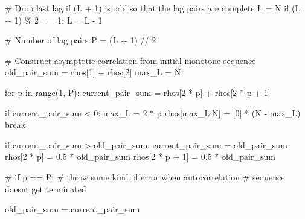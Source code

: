 \documentclass[
  letterpaper,
  DIV=11,
  numbers=noendperiod]{scrartcl}
\newenvironment{Shaded}{\begin{snugshade}}{\end{snugshade}}
\newcommand{\BuiltInTok}[1]{\textcolor[rgb]{0.00,0.23,0.31}{#1}}
\newcommand{\CommentTok}[1]{\textcolor[rgb]{0.37,0.37,0.37}{#1}}
\newcommand{\ControlFlowTok}[1]{\textcolor[rgb]{0.00,0.23,0.31}{#1}}
\newcommand{\DecValTok}[1]{\textcolor[rgb]{0.68,0.00,0.00}{#1}}
\newcommand{\FloatTok}[1]{\textcolor[rgb]{0.68,0.00,0.00}{#1}}
\newcommand{\KeywordTok}[1]{\textcolor[rgb]{0.00,0.23,0.31}{#1}}
\newcommand{\NormalTok}[1]{\textcolor[rgb]{0.00,0.23,0.31}{#1}}
\newcommand{\OperatorTok}[1]{\textcolor[rgb]{0.37,0.37,0.37}{#1}}
\begin{document}
\begin{Shaded}
\begin{Highlighting}[]
  \CommentTok{\# Drop last lag if (L + 1) is odd so that the lag pairs are complete}
\NormalTok{  L }\OperatorTok{=}\NormalTok{ N}
  \ControlFlowTok{if}\NormalTok{ (L }\OperatorTok{+} \DecValTok{1}\NormalTok{) }\OperatorTok{\%} \DecValTok{2} \OperatorTok{==} \DecValTok{1}\NormalTok{:}
\NormalTok{    L }\OperatorTok{=}\NormalTok{ L }\OperatorTok{{-}} \DecValTok{1}
  
  \CommentTok{\# Number of lag pairs}
\NormalTok{  P }\OperatorTok{=}\NormalTok{ (L }\OperatorTok{+} \DecValTok{1}\NormalTok{) }\OperatorTok{//} \DecValTok{2}
  
  \CommentTok{\# Construct asymptotic correlation from initial monotone sequence}
\NormalTok{  old\_pair\_sum }\OperatorTok{=}\NormalTok{ rhos[}\DecValTok{1}\NormalTok{] }\OperatorTok{+}\NormalTok{ rhos[}\DecValTok{2}\NormalTok{]}
\NormalTok{  max\_L }\OperatorTok{=}\NormalTok{ N}
  
  \ControlFlowTok{for}\NormalTok{ p }\KeywordTok{in} \BuiltInTok{range}\NormalTok{(}\DecValTok{1}\NormalTok{, P):}
\NormalTok{    current\_pair\_sum }\OperatorTok{=}\NormalTok{ rhos[}\DecValTok{2} \OperatorTok{*}\NormalTok{ p] }\OperatorTok{+}\NormalTok{ rhos[}\DecValTok{2} \OperatorTok{*}\NormalTok{ p }\OperatorTok{+} \DecValTok{1}\NormalTok{]}
    
    \ControlFlowTok{if}\NormalTok{ current\_pair\_sum }\OperatorTok{\textless{}} \DecValTok{0}\NormalTok{:}
\NormalTok{      max\_L }\OperatorTok{=} \DecValTok{2} \OperatorTok{*}\NormalTok{ p}
\NormalTok{      rhos[max\_L:N] }\OperatorTok{=}\NormalTok{ [}\DecValTok{0}\NormalTok{] }\OperatorTok{*}\NormalTok{ (N }\OperatorTok{{-}}\NormalTok{ max\_L)}
      \ControlFlowTok{break}
    
    \ControlFlowTok{if}\NormalTok{ current\_pair\_sum }\OperatorTok{\textgreater{}}\NormalTok{ old\_pair\_sum:}
\NormalTok{      current\_pair\_sum }\OperatorTok{=}\NormalTok{ old\_pair\_sum}
\NormalTok{      rhos[}\DecValTok{2} \OperatorTok{*}\NormalTok{ p]     }\OperatorTok{=} \FloatTok{0.5} \OperatorTok{*}\NormalTok{ old\_pair\_sum}
\NormalTok{      rhos[}\DecValTok{2} \OperatorTok{*}\NormalTok{ p }\OperatorTok{+} \DecValTok{1}\NormalTok{] }\OperatorTok{=} \FloatTok{0.5} \OperatorTok{*}\NormalTok{ old\_pair\_sum}
    
    \CommentTok{\# if p == P:}
      \CommentTok{\# throw some kind of error when autocorrelation}
      \CommentTok{\# sequence doesn\textquotesingle{}t get terminated}
    
\NormalTok{    old\_pair\_sum }\OperatorTok{=}\NormalTok{ current\_pair\_sum}
  

\end{Highlighting}
\end{Shaded}
\end{document}
